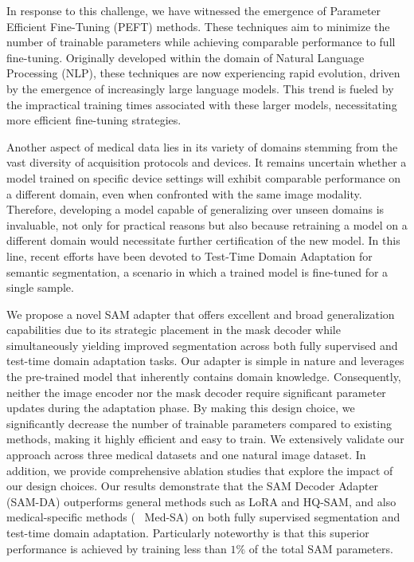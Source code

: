 In response to this challenge, we have witnessed the emergence of Parameter Efficient Fine-Tuning (PEFT) methods. These techniques aim to minimize the number of trainable parameters while achieving comparable performance to full fine-tuning. Originally developed within the domain of Natural Language Processing (NLP), these techniques are now experiencing rapid evolution, driven by the emergence of increasingly large language models. This trend is fueled by the impractical training times associated with these larger models, necessitating more efficient fine-tuning strategies. 

Another aspect of medical data lies in its variety of domains stemming from the vast diversity of acquisition protocols and devices. It remains uncertain whether a model trained on specific device settings will exhibit comparable performance on a different domain, even when confronted with the same image modality. Therefore, developing a model capable of generalizing over unseen domains is invaluable, not only for practical reasons but also because retraining a model on a different domain would necessitate further certification of the new model. In this line, recent efforts have been devoted to Test-Time Domain Adaptation for semantic segmentation, a scenario in which a trained model is fine-tuned for a single sample. 

We propose a novel SAM adapter that offers excellent and broad generalization capabilities due to its strategic placement in the mask decoder while simultaneously yielding improved segmentation across both fully supervised and test-time domain adaptation tasks. Our adapter is simple in nature and leverages the pre-trained model that inherently contains domain knowledge. Consequently, neither the image encoder nor the mask decoder require significant parameter updates during the adaptation phase. By making this design choice, we significantly decrease the number of trainable parameters compared to existing methods, making it highly efficient and easy to train. We extensively validate our approach across three medical datasets and one natural image dataset. In addition, we provide comprehensive ablation studies that explore the impact of our design choices. Our results demonstrate that the SAM Decoder Adapter (SAM-DA) outperforms general methods such as LoRA and HQ-SAM, and also medical-specific methods (\eg~ Med-SA) on both fully supervised segmentation and test-time domain adaptation. Particularly noteworthy is that this superior performance is achieved by training less than $1\%$ of the total SAM parameters.

